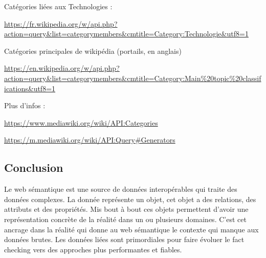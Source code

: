 Catégories liées aux Technologies :

\url{https://fr.wikipedia.org/w/api.php?action=query&list=categorymembers&cmtitle=Category:Technologie&utf8=1}

Catégories principales de wikipédia (portails, en anglais)

\url{https://en.wikipedia.org/w/api.php?action=query&list=categorymembers&cmtitle=Category:Main%20topic%20classifications&utf8=1}

Plus d'infos : 

\url{https://www.mediawiki.org/wiki/API:Categories}

\url{https://m.mediawiki.org/wiki/API:Query#Generators}
\fi

\subsection{Conclusion}

Le web sémantique est une source de données interopérables qui traite des données complexes. La donnée représente un objet, cet objet a des relations, des attributs et des propriétés. Mis bout à bout ces objets permettent d'avoir une représentation concrète de la réalité dans un ou plusieurs domaines. C'est cet ancrage dans la réalité qui donne au web sémantique le contexte qui manque aux données brutes. Les données liées sont primordiales pour faire évoluer le fact checking vers des approches plus performantes et fiables.